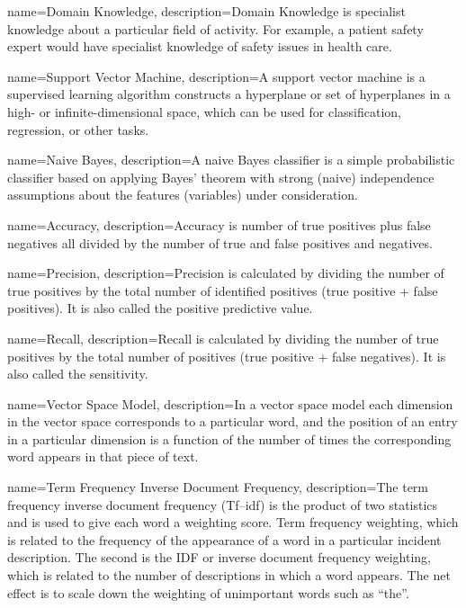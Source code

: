 {
  name=Domain Knowledge,
  description={Domain Knowledge is specialist knowledge about a particular field of activity. For example, a patient safety expert would have specialist knowledge of safety issues in health care.}
}

{
  name=Support Vector Machine,
  description={A support vector machine is a supervised learning algorithm constructs a hyperplane or set of hyperplanes in a high- or infinite-dimensional space, which can be used for classification, regression, or other tasks.}
}


{
  name=Naive Bayes,
  description={A naive Bayes classifier is a simple probabilistic classifier based on applying Bayes' theorem with strong (naive) independence assumptions about the features (variables) under consideration.}
}

{
  name=Accuracy,
  description={Accuracy is number of true positives plus false negatives all divided by the number of true and false positives and negatives.}
}


{
  name=Precision,
  description={Precision is calculated by dividing the number of true positives by the total number of identified positives (true positive + false positives). It is also called the positive predictive value.}
}

{
  name=Recall,
  description={Recall is calculated by dividing the number of true positives by the total number of positives (true positive + false negatives). It is also called the sensitivity.}
}


{
  name=Vector Space Model,
  description={In a vector space model each dimension in the vector space corresponds to a particular word, and the position of an entry in a particular dimension is a function of the number of times the corresponding word appears in that piece of text.}
}

{
  name=Term Frequency Inverse Document Frequency,
  description={The term frequency inverse document frequency (Tf–idf) is the product of two statistics and is used to give each word a weighting score. Term frequency weighting, which is related to the frequency of the appearance of a word in a particular incident description. The second is the IDF or inverse document frequency weighting, which is related to the number of descriptions in which a word appears. The net effect is to scale down the weighting of unimportant words such as ``the''.}
}

